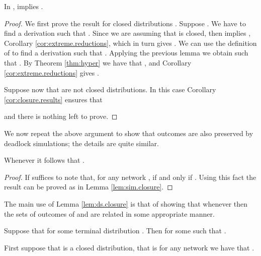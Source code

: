 \documentclass{LMCS}
\begin{document}
\begin{cor}\label{cor:results}
   In ,  implies
  .
\end{cor}
\begin{proof}
	We first prove the result for closed distributions .
  Suppose . We have to find  a derivation  such
  that . 
  Since we are assuming that  is closed, then  implies 
  , Corollary \ref{cor:extreme.reductions}, 
  which in turn gives .
  We can use the definition of  to find a 
        derivation  such that . 
        Applying the previous lemma we obtain  such that 
        . By Theorem \ref{thm:hyper} we have that 
        , and Corollary \ref{cor:extreme.reductions} 
        gives . 

	Suppose now that  are not closed distributions. 
	In this case Corollary \ref{cor:closure.results} ensures that 
	
	\noindent and there is nothing left to prove. 
\end{proof}


\bigskip

We now repeat the above argument to show that outcomes are also preserved by
deadlock simulations; the details are quite similar. 
\begin{lem}
\label{lem:ds.closure}
Whenever  it follows that 
.
\end{lem}

\begin{proof}
If suffices to note that, for any network 
,  
if and only if . 
Using this fact the result can be proved as in Lemma 
\ref{lem:sim.closure}.
\end{proof}

The main use of Lemma \ref{lem:ds.closure} is that of 
showing that whenever  then 
the sets of outcomes of  and  are 
related in some appropriate manner. 

\begin{lem}  
\label{lem:ds.outcomes}
Suppose that  
for some terminal distribution . 
Then  for some 
 such that .
\end{lem}

\proof
First suppose that  is a closed 
distribution, that is for any network  we have that 
. 
\end{document}
